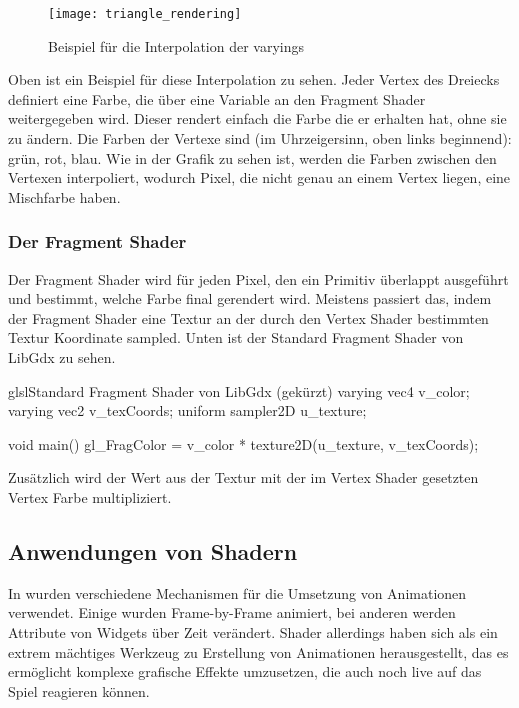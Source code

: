 \begin{figure}[H]
    \centering
    \texttt{[image: triangle\_rendering]}
    \caption{Beispiel für die Interpolation der varyings}
\end{figure}

Oben ist ein Beispiel für diese Interpolation zu sehen.
Jeder Vertex des Dreiecks definiert eine Farbe, die über eine  Variable an den Fragment Shader
weitergegeben wird.
Dieser rendert einfach die Farbe die er erhalten hat, ohne sie zu ändern.
Die Farben der Vertexe sind (im Uhrzeigersinn, oben links beginnend): grün, rot, blau.
Wie in der Grafik zu sehen ist, werden die Farben zwischen den Vertexen interpoliert, wodurch Pixel, die nicht genau
an einem Vertex liegen, eine Mischfarbe haben.

\subsubsection{Der Fragment Shader}

Der Fragment Shader wird für jeden Pixel, den ein Primitiv überlappt ausgeführt und bestimmt, welche Farbe final
gerendert wird.
Meistens passiert das, indem der Fragment Shader eine Textur an der durch den Vertex Shader bestimmten Textur
Koordinate sampled.
Unten ist der Standard Fragment Shader von LibGdx zu sehen.

\begin{codeBlock}{glsl}{Standard Fragment Shader von LibGdx (gekürzt)}
varying vec4 v_color;
varying vec2 v_texCoords;
uniform sampler2D u_texture;

void main() {
    gl_FragColor = v_color * texture2D(u_texture, v_texCoords);
}
\end{codeBlock}

Zusätzlich wird der Wert aus der Textur mit der im Vertex Shader gesetzten Vertex Farbe multipliziert.

\subsection{Anwendungen von Shadern}

In \FF wurden verschiedene Mechanismen für die Umsetzung von Animationen verwendet.
Einige wurden Frame-by-Frame animiert, bei anderen werden Attribute von Widgets über Zeit verändert.
Shader allerdings haben sich als ein extrem mächtiges Werkzeug zu Erstellung von Animationen herausgestellt, das es
ermöglicht komplexe grafische Effekte umzusetzen, die auch noch live auf das Spiel reagieren können.

